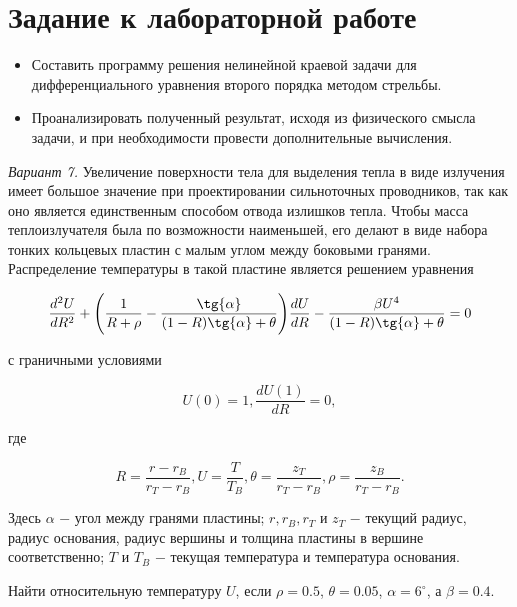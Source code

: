 \documentclass[a4paper,12pt]{article}
\begin{document}


\section{\normalsize{Задание к лабораторной работе}}
\begin{flushleft}
    \begin{itemize}
        \item Составить программу решения нелинейной краевой задачи для дифференциального уравнения второго порядка методом стрельбы.
        \item Проанализировать полученный результат, исходя из физического смысла задачи, и при необходимости провести дополнительные вычисления.
    \end{itemize}
\end{flushleft}
\begin{flushleft}
    \textit{Вариант 7.}\linebreak
    Увеличение поверхности тела для выделения тепла в виде излучения имеет большое значение при проектировании сильноточных проводников, так как оно является
    единственным способом отвода излишков тепла. Чтобы масса теплоизлучателя была по возможности наименьшей, его делают в виде набора тонких кольцевых пластин
    с малым углом между боковыми гранями. Распределение температуры в такой пластине является решением уравнения

    \[\frac{d^2U}{dR^2} + \Bigg(\frac{1}{R + \rho} - \frac{\tg{\alpha}}{(1-R)\tg{\alpha} + \theta}\Bigg)\frac{dU}{dR} - \frac{\beta U^4}{(1-R)\tg{\alpha}+\theta} = 0\]

    с граничными условиями

    \[U(0) = 1, \frac{dU(1)}{dR} = 0,\]

    где 

    \[R = \frac{r - r_B}{r_T - r_B}, U = \frac{T}{T_B}, \theta = \frac{z_T}{r_T - r_B}, \rho = \frac{z_B}{r_T - r_B}.\]

    Здесь $\alpha$ $-$ угол между гранями пластины; $r, r_B, r_T$ и $z_T$ $-$ текущий радиус, радиус основания, радиус вершины и толщина пластины в вершине соответственно;
    $T$ и $T_B$ $-$ текущая температура и температура основания.\linebreak

    Найти относительную температуру $U$, если $\rho = 0.5$, $\theta = 0.05$, $\alpha = 6^{\circ}$, а $\beta = 0.4$.
\end{flushleft}
\end{document}
